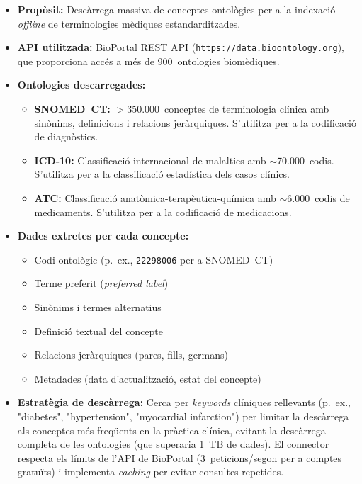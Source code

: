 \documentclass[CAT]{TFUOC}%
\begin{document}
\begin{itemize}
    \item \textbf{Propòsit:} Descàrrega massiva de conceptes ontològics per a la indexació \textit{offline} de terminologies mèdiques estandarditzades.
    
    \item \textbf{API utilitzada:} BioPortal REST API (\texttt{https://data.bioontology.org}), que proporciona accés a més de 900~ontologies biomèdiques.
    
    \item \textbf{Ontologies descarregades:}
    \begin{itemize}
        \item \textbf{SNOMED~CT:} $>$350.000~conceptes de terminologia clínica amb sinònims, definicions i relacions jeràrquiques. S'utilitza per a la codificació de diagnòstics.
        \item \textbf{ICD-10:} Classificació internacional de malalties amb $\sim$70.000~codis. S'utilitza per a la classificació estadística dels casos clínics.
        \item \textbf{ATC:} Classificació anatòmica-terapèutica-química amb $\sim$6.000~codis de medicaments. S'utilitza per a la codificació de medicacions.
    \end{itemize}
    
    \item \textbf{Dades extretes per cada concepte:}
    \begin{itemize}
        \item Codi ontològic (p.~ex., \texttt{22298006} per a SNOMED~CT)
        \item Terme preferit (\textit{preferred label})
        \item Sinònims i termes alternatius
        \item Definició textual del concepte
        \item Relacions jeràrquiques (pares, fills, germans)
        \item Metadades (data d'actualització, estat del concepte)
    \end{itemize}
    
    \item \textbf{Estratègia de descàrrega:} Cerca per \textit{keywords} clíniques rellevants (p.~ex., "diabetes", "hypertension", "myocardial infarction") per limitar la descàrrega als conceptes més freqüents en la pràctica clínica, evitant la descàrrega completa de les ontologies (que superaria 1~TB de dades). El connector respecta els límits de l'API de BioPortal (3~peticions/segon per a comptes gratuïts) i implementa \textit{caching} per evitar consultes repetides.
\end{itemize}
\end{document}
